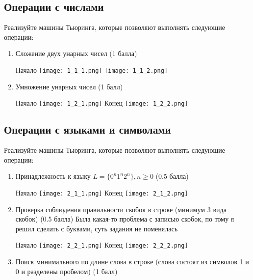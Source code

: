 \documentclass{article}
\begin{document}
\subsection{Операции с числами}

Реализуйте машины Тьюринга, которые позволяют выполнять следующие операции:
\begin{enumerate}
    \item Сложение двух унарных чисел (1 балла)
    \begin{center}
    Начало
        \texttt{[image: 1\_1\_1.png]}
        \texttt{[image: 1\_1\_2.png]} 
    \end{center}  \newpage
    \item Умножение унарных чисел (1 балл)
    \begin{center}
    Начало
        \texttt{[image: 1\_2\_1.png]}\newpage
    Конец
        \texttt{[image: 1\_2\_2.png]} 
    \end{center}    
\end{enumerate}

\newpage
\subsection{Операции с языками и символами}

Реализуйте машины Тьюринга, которые позволяют выполнять следующие операции:
\begin{enumerate}
    \item Принадлежность к языку $L = \{ 0^n1^n2^n \}, n \ge 0$ (0.5 балла)
        \begin{center}
    Начало
        \texttt{[image: 2\_1\_1.png]}\newpage
    Конец
        \texttt{[image: 2\_1\_2.png]} 
    \end{center}\newpage
    \item Проверка соблюдения правильности скобок в строке (минимум 3 вида скобок) (0.5 балла)
    Была какая-то проблема с записью скобок, по
    тому я решил сделать с буквами, суть задания не поменялась
    \begin{center}
    Начало
        \texttt{[image: 2\_2\_1.png]}\newpage
    Конец
        \texttt{[image: 2\_2\_2.png]} 
    \end{center}
    \item Поиск минимального по длине слова в строке (слова состоят из символов 1 и 0 и разделены пробелом) (1 балл)
\end{enumerate}
\end{document}
